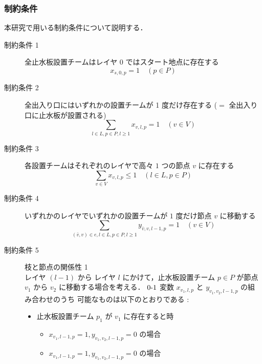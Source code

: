 \documentclass[a4paper,12pt,fleqn]{jarticle}
\begin{document}
  \subsubsection{制約条件}
  本研究で用いる制約条件について説明する．
\begin{description}

\item [制約条件 1] 全止水板設置チームはレイヤ $0$ ではスタート地点に存在する
  \begin{equation}
    x_{s,0,p}=1 \quad (p \in P)\label{eq:Initialposition}
  \end{equation}

\item [制約条件 2] 全出入り口にはいずれかの設置チームが 1 度だけ存在する ($=$ 全出入り口に止水板が設置される)
  \begin{equation}
    \displaystyle \sum_{l \in L, p \in P, l \geq 1}x_{v,l,p}=1 \quad (v \in V)\label{eq:AllWaterstop}
  \end{equation}

\item [制約条件 3] 各設置チームはそれぞれのレイヤで高々 $1$ つの節点 $v$ に存在する
  \begin{equation}
    \displaystyle \sum_{v\in V}x_{v,l,p}\leq 1 \quad (l \in L, p \in P)\label{eq:OneByOne}
  \end{equation}

\item [制約条件 4] いずれかのレイヤでいずれかの設置チームが $1$ 度だけ節点 $v$ に移動する
  \begin{equation}
    \displaystyle \sum_{(\bar{v},v)\in e,l \in L,p \in P,l \geq 1}y_{\bar{v},v,l-1,p}=1 \quad (v \in V)\label{eq:SequentialInstall}
  \end{equation}

\item [制約条件 5] 枝と節点の関係性 1\\
  レイヤ $(l - 1)$ から レイヤ $l$ にかけて，止水板設置チーム $p \in P$ が節点 $v_1$ から $v_2$ に移動する場合を考える．
  $0\mathchar`-1$ 変数 $x_{v_1,l,p}$ と $y_{v_1,v_2,l-1,p}$ の組み合わせのうち 可能なものは以下のとおりである :
\newpage
  \begin{itemize}
  \item 止水板設置チーム $p_1$ が $v_1$ に存在すると時
    \begin{itemize}
    \item $x_{v_1,l-1,p}=1, y_{v_1,v_2,l-1,p}=0$ の場合
    \item $x_{v_1,l-1,p}=1, y_{v_1,v_2,l-1,p}=0$ の場合
    \end{itemize}
    

\end{itemize}
\end{description}
\end{document}
